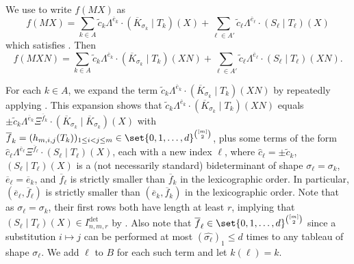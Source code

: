 \documentclass[letterpaper, 11pt]{amsart}
\begin{document}
\begin{pf}
We use  to write $f(MX)$ as 
\[
    f(MX) = \sum_{k \in A} \widetilde{c}_k \Lambda^{\overline{e}_k}\cdot (\overline{K}_{\sigma_k}\mid T_k)(X) + \sum_{\ell\in A'} \widetilde{c}_{\ell} \Lambda^{\overline{e}_\ell}\cdot (S_\ell\mid T_\ell)(X)
\]
which satisfies .
Then
\[
f(MXN)=\sum_{k \in A} \widetilde{c}_{k} \Lambda^{\overline{e}_k}\cdot (\overline{K}_{\sigma_k}\mid T_k)(XN)
+\sum_{\ell \in A'} \widetilde{c}_{\ell} \Lambda^{\overline{e}_\ell}\cdot (S_\ell\mid T_\ell)(XN).
\]

For each $k\in A$, we expand the term $\widetilde{c}_{k} \Lambda^{\overline{e}_k}\cdot (\overline{K}_{\sigma_k}\mid T_k)(XN)$ by repeatedly applying .
This expansion shows that $\widetilde{c}_{k} \Lambda^{\overline{e}_k}\cdot (\overline{K}_{\sigma_k}\mid T_k)(XN)$ equals $\pm \widetilde{c}_{k} \Lambda^{\overline{e}_k}\Xi^{\overline{f}_k}\cdot (\overline{K}_{\sigma_k}\mid \overline{K}_{\sigma_k})(X)$ with $\overline{f}_k=(h_{m,i,j}(T_k))_{1\leq i<j\leq m} \in \set{0,1,\dots,d}^{\binom{[m]}{2}}$, 
plus some terms of the form $\widehat{c}_{\ell}\Lambda^{\overline{e}_\ell}\Xi^{\overline{f}_\ell}\cdot (S_\ell\mid T_\ell)(X)$, each with a new index $\ell$,
where $\widehat{c}_{\ell}=\pm \widetilde{c}_k$, $(S_\ell\mid T_\ell)(X)$ is a (not necessarily standard) bideterminant of shape $\sigma_\ell=\sigma_k$, $\overline{e}_\ell=\overline{e}_k$, and $\overline{f}_\ell$ is strictly smaller than $\overline{f}_k$ in the lexicographic order.
In particular, $(\overline{e}_\ell, \overline{f}_\ell)$ is strictly smaller than $(\overline{e}_k, \overline{f}_k)$ in the lexicographic order.
Note that as $\sigma_\ell=\sigma_k$, their first rows both have length at least $r$, implying that $(S_\ell\mid T_\ell)(X)\in I^{\det}_{n,m,r}$ by .
Also note that $\overline{f}_\ell \in \set{0,1,\dots,d}^{\binom{[m]}{2}}$ since a substitution $i\mapsto j$ can be performed at most $(\widehat{\sigma_\ell})_1 \leq d$ times to any tableau of shape $\sigma_\ell$.
We add $\ell$ to $B$ for each such term and let $k(\ell)=k$.


\end{pf}
\end{document}
